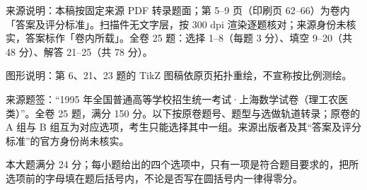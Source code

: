 

\begin{gktip}
来源说明：本稿按固定来源 PDF 转录题面；第 5–9 页（印刷页 62–66）为卷内「答案及评分标准」。扫描件无文字层，按 300 dpi 渲染逐题核对；来源身份未核实，答案标作「卷内所载」。全卷 25 题：选择 1–8（每题 3 分）、填空 9–20（共 48 分）、解答 21–25（共 78 分）。

图形说明：第 6、21、23 题的 TikZ 图稿依原页拓扑重绘，不宣称按比例测绘。
\end{gktip}

来源题签：“1995 年全国普通高等学校招生统一考试·上海数学试卷（理工农医类）”。全卷 25 题，满分 150 分。以下按原卷题号、题型与选做轨道转录；原卷的 A 组与 B 组互为对应选项，考生只能选择其中一组。来源出版者及其“答案及评分标准”的官方身份尚未核实。


本大题满分 24 分；每小题给出的四个选项中，只有一项是符合题目要求的，把所选项前的字母填在题后括号内，不论是否写在圆括号内一律得零分。

